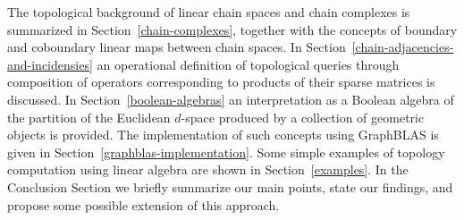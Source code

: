The topological background of linear chain spaces and chain complexes is summarized in Section~\ref{chain-complexes}, together with the concepts of boundary and coboundary linear maps between chain spaces.
In Section~\ref{chain-adjacencies-and-incidensies} an operational definition of topological queries through composition of operators corresponding to products of their sparse matrices is discussed.
In Section~\ref{boolean-algebras} an interpretation as a Boolean algebra of the partition of the Euclidean $d$-space produced by a collection of geometric objects is provided.
The implementation of such concepts using GraphBLAS is given in Section~\ref{graphblas-implementation}. Some simple examples of topology computation using linear algebra are shown in  Section~\ref{examples}.
In the Conclusion Section we briefly summarize our main points, state our findings, and propose some possible extension of this approach.
